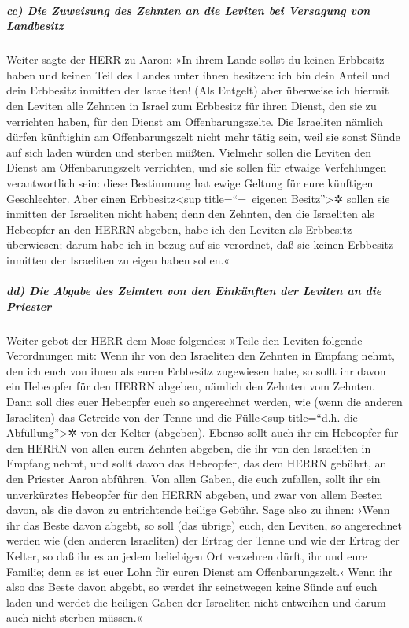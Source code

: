 \hypertarget{cc-die-zuweisung-des-zehnten-an-die-leviten-bei-versagung-von-landbesitz}{%
\subparagraph{cc) Die Zuweisung des Zehnten an die Leviten bei Versagung
von
Landbesitz}\label{cc-die-zuweisung-des-zehnten-an-die-leviten-bei-versagung-von-landbesitz}}

Weiter sagte der HERR zu Aaron: »In ihrem Lande sollst du
keinen Erbbesitz haben und keinen Teil des Landes unter ihnen besitzen:
ich bin dein Anteil und dein Erbbesitz inmitten der Israeliten!
(Als Entgelt) aber überweise ich hiermit den Leviten alle
Zehnten in Israel zum Erbbesitz für ihren Dienst, den sie zu verrichten
haben, für den Dienst am Offenbarungszelte. Die
Israeliten nämlich dürfen künftighin am Offenbarungszelt nicht mehr
tätig sein, weil sie sonst Sünde auf sich laden würden und sterben
müßten. Vielmehr sollen die Leviten den Dienst am
Offenbarungszelt verrichten, und sie sollen für etwaige Verfehlungen
verantwortlich sein: diese Bestimmung hat ewige Geltung für eure
künftigen Geschlechter. Aber einen Erbbesitz\textless sup
title=``=~eigenen Besitz''\textgreater✲ sollen sie inmitten der
Israeliten nicht haben; denn den Zehnten, den die
Israeliten als Hebeopfer an den HERRN abgeben, habe ich den Leviten als
Erbbesitz überwiesen; darum habe ich in bezug auf sie verordnet, daß sie
keinen Erbbesitz inmitten der Israeliten zu eigen haben sollen.«

\hypertarget{dd-die-abgabe-des-zehnten-von-den-einkuxfcnften-der-leviten-an-die-priester}{%
\subparagraph{dd) Die Abgabe des Zehnten von den Einkünften der Leviten
an die
Priester}\label{dd-die-abgabe-des-zehnten-von-den-einkuxfcnften-der-leviten-an-die-priester}}

Weiter gebot der HERR dem Mose folgendes:
»Teile den Leviten folgende Verordnungen mit: Wenn ihr
von den Israeliten den Zehnten in Empfang nehmt, den ich euch von ihnen
als euren Erbbesitz zugewiesen habe, so sollt ihr davon ein Hebeopfer
für den HERRN abgeben, nämlich den Zehnten vom Zehnten.
Dann soll dies euer Hebeopfer euch so angerechnet werden,
wie (wenn die anderen Israeliten) das Getreide von der Tenne und die
Fülle\textless sup title=``d.h. die Abfüllung''\textgreater✲ von der
Kelter (abgeben). Ebenso sollt auch ihr ein Hebeopfer für
den HERRN von allen euren Zehnten abgeben, die ihr von den Israeliten in
Empfang nehmt, und sollt davon das Hebeopfer, das dem HERRN gebührt, an
den Priester Aaron abführen. Von allen Gaben, die euch
zufallen, sollt ihr ein unverkürztes Hebeopfer für den HERRN abgeben,
und zwar von allem Besten davon, als die davon zu entrichtende heilige
Gebühr. Sage also zu ihnen: ›Wenn ihr das Beste davon
abgebt, so soll (das übrige) euch, den Leviten, so angerechnet werden
wie (den anderen Israeliten) der Ertrag der Tenne und wie der Ertrag der
Kelter, so daß ihr es an jedem beliebigen Ort verzehren
dürft, ihr und eure Familie; denn es ist euer Lohn für euren Dienst am
Offenbarungszelt.‹ Wenn ihr also das Beste davon abgebt,
so werdet ihr seinetwegen keine Sünde auf euch laden und werdet die
heiligen Gaben der Israeliten nicht entweihen und darum auch nicht
sterben müssen.«

